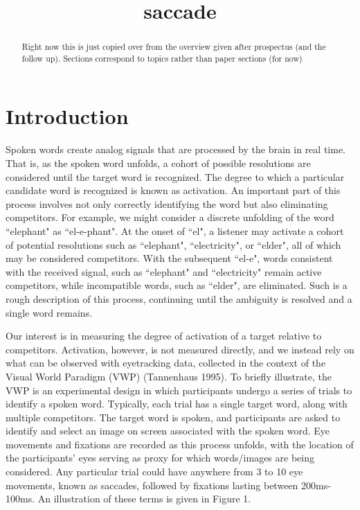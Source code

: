 \documentclass{article}
\title{saccade}
\date{}
\begin{document}

\maketitle

%

\begin{abstract}
Right now this is just copied over from the overview given after prospectus (and the follow up). Sections correspond to topics rather than paper sections (for now)
\end{abstract}

\section{Introduction}
Spoken words create analog signals that are processed by the brain in real time. That is, as the spoken word unfolds, a cohort of possible resolutions are considered until the target word is recognized. The degree to which a particular candidate word is recognized is known as activation. An important part of this process involves not only correctly identifying the word but also eliminating competitors. For example, we might consider a discrete unfolding of the word ``elephant" as ``el-e-phant". At the onset of ``el", a listener may activate a cohort of potential resolutions such as ``elephant", ``electricity", or ``elder", all of which may be considered competitors. With the subsequent ``el-e", words consistent with the received signal, such as ``elephant" and ``electricity" remain active competitors, while incompatible words, such as ``elder", are eliminated. Such is a rough description of this process, continuing until the ambiguity is resolved and a single word remains.

Our interest is in measuring the degree of activation of a target relative to competitors. Activation, however, is not measured directly, and we instead rely on what can be observed with eyetracking data, collected in the context of the Visual World Paradigm (VWP) (Tannenhaus 1995)\cite{tanenhaus1995integration}. To briefly illustrate, the VWP is an experimental design in which participants undergo a series of trials to identify a spoken word. Typically, each trial has a single target word, along with multiple competitors. The target word is spoken, and participants are asked to identify and select an image on screen associated with the spoken word. Eye movements and fixations are recorded as this process unfolds, with the location of the participants' eyes serving as proxy for which words/images are being considered. Any particular trial could have anywhere from 3 to 10 eye movements, known as saccades, followed by fixations lasting between 200ms-100ms. An illustration of these terms is given in Figure 1. 
\end{document}
